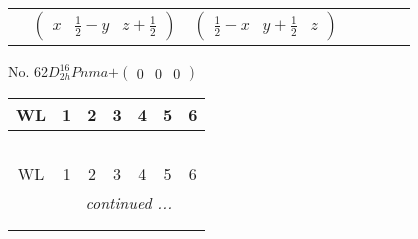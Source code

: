 \documentclass[fleqn,9pt,landscape]{jsarticle}
\begin{document}
\begin{center}
\begin{longtable}{ccccccc}
& $ \begin{pmatrix} x & \frac{1}{2} - y & z + \frac{1}{2} \end{pmatrix} $ & $ \begin{pmatrix} \frac{1}{2} - x & y + \frac{1}{2} & z \end{pmatrix} $ & $  $ & $  $ & $  $ & $  $ \\
\end{longtable}
\end{center}
\newpage
No. 62\quad$D_{2h}^{16}$\quad$Pnma$\quad[ orthorhombic ]\quad$+\begin{pmatrix} 0 & 0 & 0 \end{pmatrix}$
\begin{center}
\renewcommand{\arraystretch}{1.2}
\begin{longtable}{ccccccc}
 \hline \hline
WL & 1 & 2 & 3 & 4 & 5 & 6 \\ \hline \endfirsthead

\multicolumn{6}{l}{\tablename\ \thetable{}} \\
 \hline \hline
WL & 1 & 2 & 3 & 4 & 5 & 6 \\ \hline \endhead

 \hline \hline
\multicolumn{6}{r}{\footnotesize\it continued ...} \\ \endfoot

 \hline \hline
\multicolumn{6}{r}{} \\ \endlastfoot


\end{longtable}
\end{center}
\end{document}
